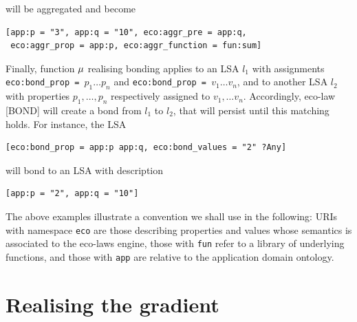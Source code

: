 \documentclass[12pt,a4paper,twoside,openright]{book}
\begin{document}
will be aggregated and become

{\begin{Verbatim}[samepage=true, frame=single]
[app:p = "3", app:q = "10", eco:aggr_pre = app:q, 
 eco:aggr_prop = app:p, eco:aggr_function = fun:sum]
\end{Verbatim}
}

Finally, function $\mu$ realising bonding applies to an LSA $l_1$ with assignments \texttt{eco:bond\_prop = $p_1 \ldots p_n$} and \texttt{eco:bond\_prop = $v_1 \ldots v_n$}, and to another LSA $l_2$ with properties $p_1,\ldots,p_n$ respectively assigned to $v_1,\ldots v_n$.
%
Accordingly, eco-law [BOND] will create a bond from $l_1$ to $l_2$, that will persist until this matching holds.
%
For instance, the LSA

{\begin{Verbatim}[samepage=true, frame=single]
[eco:bond_prop = app:p app:q, eco:bond_values = "2" ?Any]
\end{Verbatim}
}

will bond to an LSA with description

{\begin{Verbatim}[samepage=true, frame=single]
[app:p = "2", app:q = "10"]
\end{Verbatim}
}

The above examples illustrate a convention we shall use in the following: URIs with namespace \texttt{eco} are those describing properties and values whose semantics is associated to the eco-laws engine, those with \texttt{fun} refer to a library of underlying functions, and those with \texttt{app} are relative to the application domain ontology.


\section{Realising the gradient}\label{s:grad}
\end{document}
